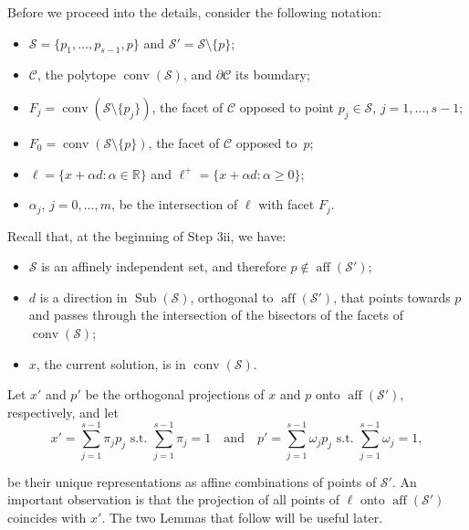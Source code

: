 \medskip
 
\noindent Before we proceed into the details, consider the following notation:
\begin{itemize}
	\item ${\mathcal{S}}=\{p_1, \dots, p_{s-1}, {{p}}\}$ and ${\mathcal{S}}'={\mathcal{S}}\setminus\{{{p}}\}$;
	\item ${\mathcal{C}}$, the polytope ${\operatorname{conv}}({\mathcal{S}})$, and $\partial {\mathcal{C}}$ its boundary;
	\item $F_j= {\operatorname{conv}}({\mathcal{S}}\setminus\{p_j\})$, the facet of ${\mathcal{C}}$ opposed to point $p_j\in{\mathcal{S}}$, $j=1,...,s-1$;
	\item $F_0={\operatorname{conv}}({\mathcal{S}}\setminus\{{{p}}\})$, the facet of ${\mathcal{C}}$ opposed to~${{p}}$;
	\item $\ell=\{x+\alpha d: \alpha\in{\mathbb{R}}\}$ and $\ell^+=\{x+\alpha d: \alpha\geq 0\}$;
	\item $\alpha_j$, $j=0,\dots,m$, be the intersection of $\ell$ with facet $F_j$.
\end{itemize}

\medskip

Recall that, at the beginning of Step 3ii, we have:
\begin{itemize}
	\item ${\mathcal{S}}$ is an affinely independent set, and therefore ${{p}}\not\in{\operatorname{aff}}({\mathcal{S}}')$;
	\item $d$ is a direction in ${\operatorname{Sub}}({\mathcal{S}})$, orthogonal to ${\operatorname{aff}}({\mathcal{S}}')$, that points towards ${{p}}$ and passes through the intersection of the bisectors of the facets of ${\operatorname{conv}}({\mathcal{S}})$;
	\item $x$, the current solution, is in ${\operatorname{conv}}({\mathcal{S}})$.
\end{itemize} 

\medskip

Let $x'$ and $p'$ be the orthogonal projections of $x$ and ${{p}}$ onto ${\operatorname{aff}}({\mathcal{S}}')$, respectively, and let
\begin{equation}\label{rep}
x'=\sum_{j=1}^{s-1} \pi_j p_j\text{ s.t. } \sum_{j=1}^{s-1} \pi_j =1\quad\text{and}\quad p'=\sum_{j=1}^{s-1} \omega_j p_j\text{ s.t. } \sum_{j=1}^{s-1} \omega_j=1,
\end{equation}

\noindent be their unique representations as affine combinations of points of ${\mathcal{S}}'$. An important observation is that the projection of all points of $\ell$ onto ${\operatorname{aff}}({\mathcal{S}}')$ coincides with $x'$. The two Lemmas that follow will be useful later.

